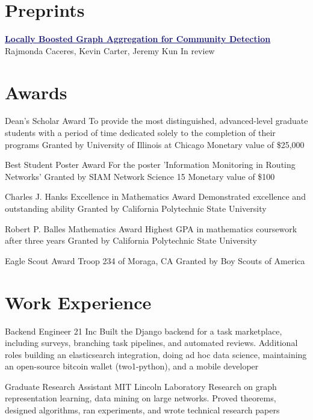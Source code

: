 \documentclass[11pt]{moderncv}
\begin{document}
   \section{Preprints}
         \cventry{}
         {\href{http://arxiv.org/abs/1405.3210}{\textcolor{MidnightBlue}{\underline{\textbf{Locally Boosted Graph Aggregation for Community Detection}}}}}
      {}
      {Rajmonda Caceres, Kevin Carter, Jeremy Kun}
      {}
      {In review}


   \section{Awards}
         {Dean's Scholar Award}
      {To provide the most distinguished, advanced-level graduate students with a period of time dedicated solely to the completion of their programs}
      {Granted by University of Illinois at Chicago}
      {}
      {Monetary value of \$25,000}

         {Best Student Poster Award}
      {For the poster 'Information Monitoring in Routing Networks'}
      {Granted by SIAM Network Science 15}
      {}
      {Monetary value of \$100}

         {Charles J. Hanks Excellence in Mathematics Award}
      {Demonstrated excellence and outstanding ability}
      {Granted by California Polytechnic State University}
      {}
{}

         {Robert P. Balles Mathematics Award}
      {Highest GPA in mathematics coursework after three years}
      {Granted by California Polytechnic State University}
      {}
{}

         {Eagle Scout Award}
      {Troop 234 of Moraga, CA}
      {Granted by Boy Scouts of America}
      {}
{}


   \section{Work Experience}
         {Backend Engineer}
      {21 Inc}
      {}
      {}
      {Built the Django backend for a task marketplace, including surveys, branching task pipelines, and automated reviews. Additional roles building an elasticsearch integration, doing ad hoc data science, maintaining an open-source bitcoin wallet (two1-python), and a mobile developer}

         {Graduate Research Assistant}
      {MIT Lincoln Laboratory}
      {}
      {}
      {Research on graph representation learning, data mining on large networks. Proved theorems, designed algorithms, ran experiments, and wrote technical research papers}
\end{document}
